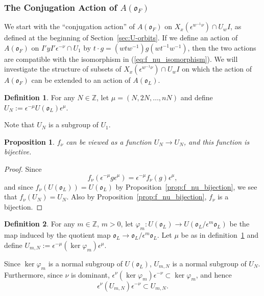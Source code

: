 \documentclass{amsart}
\newtheorem{prop}{Proposition}[subsection]
\theoremstyle{definition}
\newtheorem{defn}{Definition}[subsection]
\def\O{\mathfrak{o}}
\def\e{\epsilon}
\def\A{A(\O_F)}
\def\en{\e^{\nu}}
\def\enm{\e^{-\nu}}
\def\emu{\e^{\mu}}
\def\enmu{\e^{-\mu}}
\def\Xw{X_x(\e^{w^{-1}\nu})}
\def\phi{\varphi}
\def\f{f_\nu}
\def\Z{\mathbb{Z}}
\def\Umn{U_{m,N}}
\begin{document}
  \subsubsection{The Conjugation Action of $\A$}
  We start with the ``conjugation action'' of $\A$ on $\Xw \cap U_w I$, as
  defined at the beginning of Section~\ref{sec:U-orbits}.  If we define an
  action of $\A$ on $I'yI'\enm \cap U_1$ by $t \cdot g = (wtw^{-1}) g
  (wt^{-1}w^{-1})$, then the two actions are compatible with the isomorphism in
  (\ref{eq:f_nu_isomorphism}).  We will investigate the structure of subsets of
  $\Xw \cap U_w I$ on which the action of $\A$ can be extended to an action of
  $A(\O_L)$.

  \begin{defn}
    \label{def:U_N}
    For any $N \in \Z$, let $\mu = (N, 2N, \ldots, nN)$ and define $U_N :=
    \e^{-\mu}U(\O_L)\e^{\mu}$.
  \end{defn}
  Note that $U_N$ is a subgroup of $U_1$.
  \begin{prop}
    \label{prop:f_bijection_U_N}
    $\f$ can be viewed as a function $U_N \to U_N$, and this function is
    bijective.
  \end{prop}
  \begin{proof}
    Since
    \begin{equation*}
      \f(\enmu g \emu) = \enmu \f(g) \emu,
    \end{equation*}
    and since $\f(U(\O_L)) = U(\O_L)$ by Proposition~\ref{prop:f_nu_bijection},
    we see that $\f(U_N) = U_N$.  Also by
    Proposition~\ref{prop:f_nu_bijection}, $\f$ is a bijection.
  \end{proof}

  \begin{defn}
    For any $m \in \Z$, $m > 0$, let $\phi_m: U(\O_L) \to U(\O_L/\e^m\O_L)$ be the
    map induced by the quotient map $\O_L \to \O_L/\e^m\O_L$.  Let $\mu$ be as in
    definition~\ref{def:U_N} and define $\Umn := \e^{-\mu} (\ker \phi_m)
    \e^{\mu}$.
  \end{defn}

  Since $\ker \phi_m$ is a normal subgroup of $U(\O_L)$, $\Umn$ is a normal
  subgroup of $U_N$.  Furthermore, since $\nu$ is dominant, $\en (\ker\phi_m)
  \enm \subset \ker\phi_m$, and hence
  \begin{equation*}
    \en (\Umn) \enm \subset \Umn.
  \end{equation*}
\end{document}

